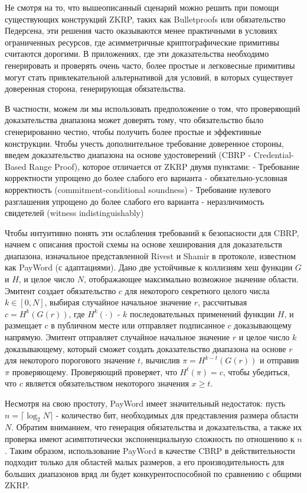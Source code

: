 Не смотря на то, что вышеописанный сценарий можно решить при помощи существующих конструкций ZKRP, таких как Bulletproofs или обязательство Педерсена, эти решения часто оказываются менее практичными в условиях ограниченных ресурсов, где асимметричные криптографические примитивы считаются дорогими.
В приложениях, где эти доказательства необходимо генерировать и проверять очень часто, более простые и легковесные примитивы могут стать привлекательной альтернативой для условий, в которых существует доверенная сторона, генерирующая обязательства.

В частности, можем ли мы использовать предположение о том, что проверяющий доказательства диапазона может доверять тому, что обязательство было сгенерированно честно, чтобы получить более простые и эффективные конструкции.
Чтобы учесть дополнительное требование доверенное стороны, введем доказательство диапазона на основе удостоверений (CBRP - Credential-Based Range Proof), которое отличается от ZKRP двумя пунктами:
- Требование корректности упрощено до более слабого его варианта - обязательно-условная корректность (commitment-conditional soundness)
- Требование нулевого разглашения упрощено до более слабого его варианта - неразличимость свидетелей (witness indistinguishably)

Чтобы интуитивно понять эти ослабления требований к безопасности для CBRP, начнем с описания простой схемы на основе хеширования для доказательств диапазона, изначальное представленной Rivest и Shamir \cite{10.1007/3-540-62494-5_6} в протоколе, известном как PayWord (с адаптациями).
Дано две устойчивые к коллизиям хеш функции $G$ и $H$, и целое число $N$, отображающее максимально возможное значение области.
Эмитент создает обязательство $c$ для некоторого секретного целого числа $k \in [0, N]$, выбирая случайное начальное значение $r$, рассчитывая $c = H^k(G(r))$, где $H^k(\cdot)$ - $k$ последовательных применений функции $H$, и размещает $c$ в публичном месте или отправляет подписанное $c$ доказывающему напрямую.
Эмитент отправляет случайное начальное значение $r$ и целое число $k$ доказывающему, который сможет создать доказательство диапазона на основе $r$ для некоторого порогового значение $t$, вычислив $\pi = H^{k - t}(G(r))$ и отправив $\pi$ проверяющему.
Проверяющий проверяет, что $H^t(\pi) = c$, чтобы убедиться, что $c$ является обязательством некоторого значения $x \geq t$.

Несмотря на свою простоту, PayWord имеет значительный недостаток: пусть $n = \lceil \log_2 N \rceil$ - количество бит, необходимых для представления размера области $N$.
Обратим вниманием, что генерация обязательства и доказательства, а также их проверка имеют асимптотически экспоненциальную сложность по отношению к $n$.
Таким образом, использование PayWord в качестве CBRP в действительности подходит только для областей малых размеров, а его производительность для больших диапазонов вряд ли будет конкурентоспособной по сравнению с общими ZKRP.

